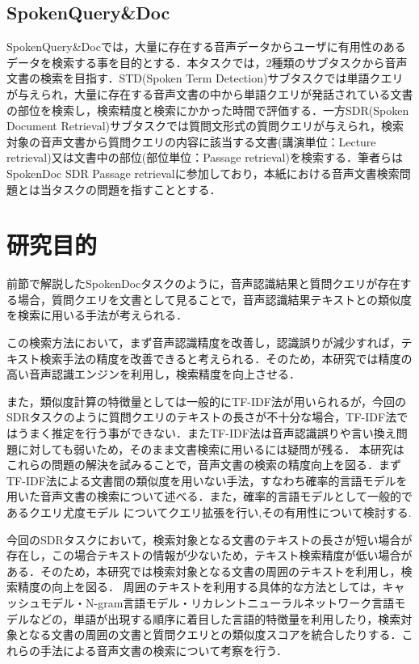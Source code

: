 \subsection{SpokenQuery\&Doc}
SpokenQuery\&Docでは，大量に存在する音声データからユーザに有用性のあるデータを検索する事を目的とする．本タスクでは，2種類のサブタスクから音声文書の検索を目指す．STD(Spoken Term Detection)サブタスクでは単語クエリが与えられ，大量に存在する音声文書の中から単語クエリが発話されている文書の部位を検索し，検索精度と検索にかかった時間で評価する．一方SDR(Spoken Document Retrieval)サブタスクでは質問文形式の質問クエリが与えられ，検索対象の音声文書から質問クエリの内容に該当する文書(講演単位：Lecture retrieval)又は文書中の部位(部位単位：Passage retrieval)を検索する．筆者らはSpokenDoc SDR Passage retrievalに参加しており，本紙における音声文書検索問題とは当タスクの問題を指すこととする．

\section{研究目的}
前節で解説したSpokenDocタスクのように，音声認識結果と質問クエリが存在する場合，質問クエリを文書として見ることで，音声認識結果テキストとの類似度を検索に用いる手法が考えられる．

この検索方法において，まず音声認識精度を改善し，認識誤りが減少すれば，テキスト検索手法の精度を改善できると考えられる．そのため，本研究では精度の高い音声認識エンジンを利用し，検索精度を向上させる．

また，類似度計算の特徴量としては一般的にTF-IDF法が用いられるが，今回のSDRタスクのように質問クエリのテキストの長さが不十分な場合，TF-IDF法ではうまく推定を行う事ができない．またTF-IDF法は音声認識誤りや言い換え問題に対しても弱いため，そのまま文書検索に用いるには疑問が残る．
本研究はこれらの問題の解決を試みることで，音声文書の検索の精度向上を図る．まずTF-IDF法による文書間の類似度を用いない手法，すなわち確率的言語モデルを用いた音声文書の検索について述べる．また，確率的言語モデルとして一般的であるクエリ尤度モデル \cite{query_likelihood}についてクエリ拡張を行い,その有用性について検討する.

今回のSDRタスクにおいて，検索対象となる文書のテキストの長さが短い場合が存在し，この場合テキストの情報が少ないため，テキスト検索精度が低い場合がある．そのため，本研究では検索対象となる文書の周囲のテキストを利用し，検索精度の向上を図る．
周囲のテキストを利用する具体的な方法としては，キャッシュモデル・N-gram言語モデル・リカレントニューラルネットワーク言語モデルなどの，単語が出現する順序に着目した言語的特徴量を利用したり，検索対象となる文書の周囲の文書と質問クエリとの類似度スコアを統合したりする．これらの手法による音声文書の検索について考察を行う．

